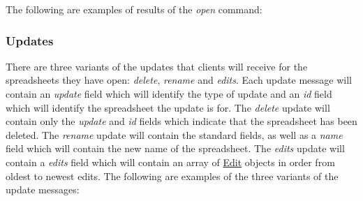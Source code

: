 The following are examples of results of the \emph{open} command:




\subsubsection{Updates}
There are three variants of the updates that clients will receive for the spreadsheets they have open: \emph{delete}, \emph{rename} and \emph{edits}.
Each update message will contain an \emph{update} field which will identify the type of update and an \emph{id} field which will identify the spreadsheet
the update is for. The \emph{delete} update will contain only the \emph{update} and \emph{id} fields which indicate that the spreadsheet has been deleted.
The \emph{rename} update will contain the standard fields, as well as a \emph{name} field which will contain the new name of the spreadsheet. The \emph{edits}
update will contain a \emph{edits} field which will contain an array of \hyperref[sec:message:edits]{Edit} objects in order from oldest to newest edits.
The following are examples of the three variants of the update messages:



